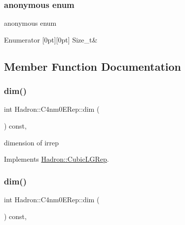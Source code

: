 \subsubsection{\texorpdfstring{anonymous enum}{anonymous enum}}
{\footnotesize\ttfamily anonymous enum}

\begin{DoxyEnumFields}{Enumerator}
[0pt][0pt]{}\mbox{\label{structHadron_1_1C4nm0ERep_a4274f4ffd23b2bf324c734d8adf03128acf71851a7fd569fd345eb94484bf3ea8}} 
Size\+\_\+t&\\
\hline

\end{DoxyEnumFields}


\subsection{Member Function Documentation}
\mbox{\label{structHadron_1_1C4nm0ERep_ad264e17a212eb7e2cf71ba25f16caa06}} 
\subsubsection{\texorpdfstring{dim()}{dim()}\hspace{0.1cm}{\footnotesize\ttfamily [1/3]}}
{\footnotesize\ttfamily int Hadron\+::\+C4nm0\+E\+Rep\+::dim (\begin{DoxyParamCaption}{ }\end{DoxyParamCaption}) const\hspace{0.3cm}{\ttfamily [inline]}, {\ttfamily [virtual]}}

dimension of irrep 

Implements \mbox{\hyperlink{structHadron_1_1CubicLGRep_a3acbaea26503ed64f20df693a48e4cdd}{Hadron\+::\+Cubic\+L\+G\+Rep}}.

\mbox{\label{structHadron_1_1C4nm0ERep_ad264e17a212eb7e2cf71ba25f16caa06}} 
\subsubsection{\texorpdfstring{dim()}{dim()}\hspace{0.1cm}{\footnotesize\ttfamily [2/3]}}
{\footnotesize\ttfamily int Hadron\+::\+C4nm0\+E\+Rep\+::dim (\begin{DoxyParamCaption}{ }\end{DoxyParamCaption}) const\hspace{0.3cm}{\ttfamily [inline]}, {\ttfamily [virtual]}}

